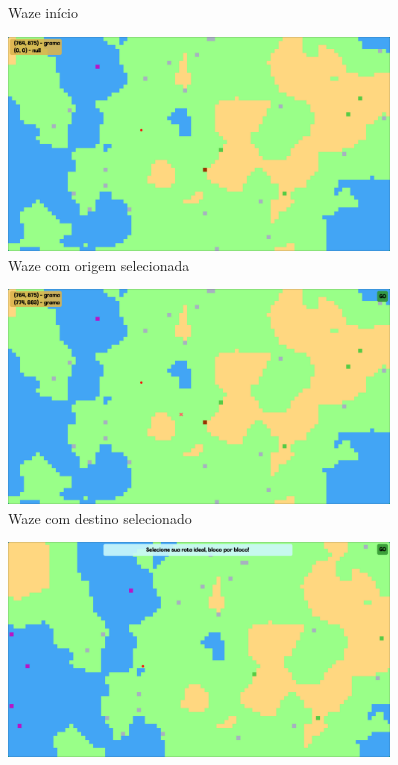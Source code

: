 \documentclass[
	12pt,				%
	oneside,			%
	a4paper,			%
	english,			%
	brazil,				%
	]{abntex2}
\begin{document}
{\begin{figure}[H]
\caption{Waze início}
\label{imagem 5}
\end{figure}
\begin{figure}[H]
\centering
\includegraphics[width=0.9\textwidth]{imgs/waze-2.png}
\caption{Waze com origem selecionada}
\label{imagem 5}
\end{figure}
\begin{figure}[H]
\centering
\includegraphics[width=0.9\textwidth]{imgs/waze-3.png}
\caption{Waze com destino selecionado}
\label{imagem 5}
\end{figure}
\begin{figure}[H]
\centering
\includegraphics[width=0.9\textwidth]{imgs/pre-game-1.png}

\end{figure}}
\end{document}
